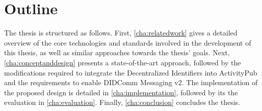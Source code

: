 \section{Outline}
The thesis is structured as follows. First, \autoref{cha:relatedwork} gives a detailed overview of the core technologies and standards involved in the development of this thesis, as well as similar approaches towards the thesis' goals. Next, \autoref{cha:conceptanddesign} presents a state-of-the-art approach, followed by the modifications required to integrate the Decentralized Identifiers into ActivityPub and the requirements to enable DIDComm Messaging v2. The implementation of the proposed design is detailed in \autoref{cha:implementation}, followed by its the evaluation in \autoref{cha:evaluation}. Finally, \autoref{cha:conclusion} concludes the thesis. 

